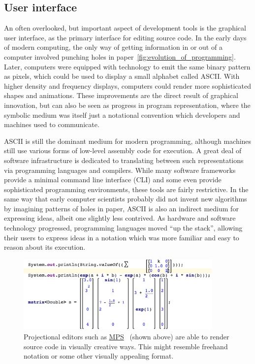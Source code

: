 \subsection{User interface}

An often overlooked, but important aspect of development tools is the graphical user interface, as the primary interface for editing source code. In the early days of modern computing, the only way of getting information in or out of a computer involved punching holes in paper~\autoref{fig:evolution_of_programming}. Later, computers were equipped with technology to emit the same binary pattern as pixels, which could be used to display a small alphabet called ASCII. With higher density and frequency displays, computers could render more sophisticated shapes and animations. These improvements are the direct result of graphical innovation, but can also be seen as progress in program representation, where the symbolic medium was itself just a notational convention which developers and machines used to communicate.

ASCII is still the dominant medium for modern programming, although machines still use various forms of low-level assembly code for execution. A great deal of software infrastructure is dedicated to translating between such representations via programming languages and compilers. While many software frameworks provide a minimal command line interface (CLI) and some even provide sophisticated programming environments, these tools are fairly restrictive. In the same way that early computer scientists probably did not invent new algorithms by imagining patterns of holes in paper, ASCII is also an indirect medium for expressing ideas, albeit one slightly less contrived. As hardware and software technology progressed, programming languages moved ``up the stack'', allowing their users to express ideas in a notation which was more familiar and easy to reason about its execution.

\begin{figure}
\centering
\includegraphics[width=0.90\textwidth]{../figures/mps_screenshot.png}
\caption{Projectional editors such as \href{https://www.jetbrains.com/mps/}{MPS}~\citep{voelter2010language, pech2013jetbrains} (shown above) are able to render source code in visually creative ways. This might resemble freehand notation or some other visually appealing format.}
\label{fig:mps_screenshot}
\end{figure}


